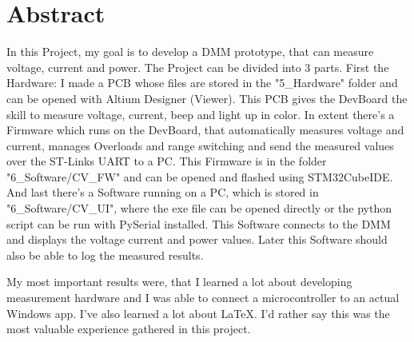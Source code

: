 \chapter*{Abstract}

In this Project, my goal is to develop a DMM prototype, that can measure voltage, current and power. The Project can be divided into 3 parts. First the Hardware: I made a PCB whose files are stored in the "5\_Hardware" folder and can be opened with Altium Designer (Viewer). This PCB gives the DevBoard the skill to measure voltage, current, beep and light up in color. In extent there's a Firmware which runs on the DevBoard, that automatically measures voltage and current, manages Overloads and range switching and send the measured values over the ST-Links UART to a PC. This Firmware is in the folder "6\_Software\slash CV\_FW" and can be opened and flashed using STM32CubeIDE. And last there's a Software running on a PC, which is stored in "6\_Software\slash CV\_UI", where the exe file can be opened directly or the python script can be run with PySerial installed. This Software connects to the DMM and displays the voltage current and power values. Later this Software should also be able to log the measured results.

My most important results were, that I learned a lot about developing measurement hardware and I was able to connect a microcontroller to an actual Windows app. I've also learned a lot about LaTeX. I'd rather say this was the most valuable experience gathered in this project.